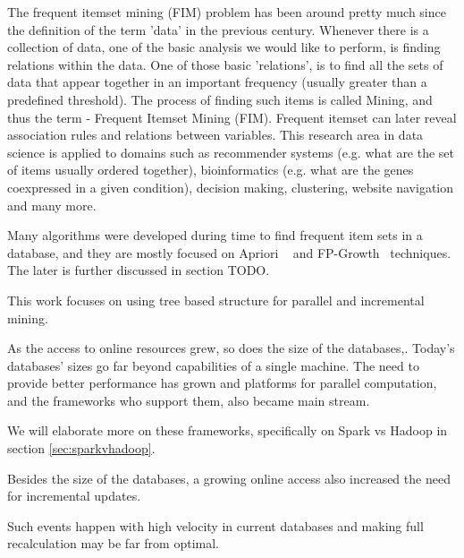 The frequent itemset mining (FIM) problem has been around pretty much since the definition of the term 'data' in the previous century. Whenever there is a collection of data, one of the basic analysis we would like to perform, is finding relations within the data. One of those basic 'relations', is to find all the sets of data that appear together in an important frequency (usually greater than a predefined threshold).  The process of finding such items is called Mining, and thus the term - Frequent Itemset Mining (FIM). Frequent itemset can later reveal association rules and relations between variables. This research area in data science is applied to domains such as recommender systems (e.g. what are the set of items usually ordered together), bioinformatics (e.g. what are the genes coexpressed in a given condition), decision making, clustering, website navigation and many more.

Many algorithms were developed during time to find frequent item sets in a database, and they are mostly focused on Apriori ~\cite{agrawal1994fast} and FP-Growth~\cite{kohefficient} techniques.  The later is further discussed in section TODO.

This work focuses on using tree based structure for parallel and incremental mining. 

As the access to online resources grew, so does the size of the databases,. Today’s databases’ sizes go far beyond capabilities of a single machine. The need to provide better performance has grown and platforms for parallel computation, and the frameworks who support them, also became main stream.

 
We will elaborate more on these frameworks, specifically on Spark vs Hadoop in section \autoref{sec:sparkvhadoop}.


Besides the size of the databases, a growing online access also increased the need for incremental updates. 
\iffalse
In case of a slight database update, like add-on of new transactions to the DB, some algorithms require a rerun of the whole database.
With the need of better performance To provide better performance, parallel execution frameworks, such as Hadoop and Spark, become more accessible and common,  and as such, so does the adoption of classical algorithms to parallel execution.  
\fi
Such events happen with high velocity in current databases and making full recalculation may be far from optimal. 

